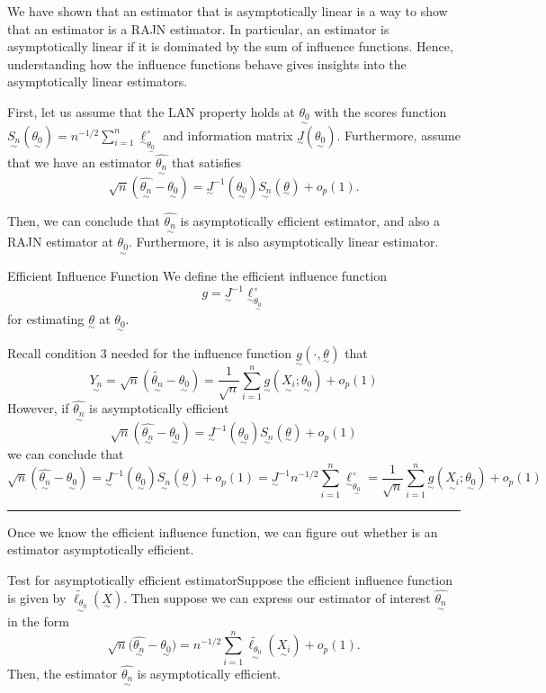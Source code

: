 \documentclass[twoside]{article}
\newenvironment{proof}{{\bf Proof:}}{\hfill\rule{2mm}{2mm}}
\newcommand{\utilde}{\underset{\sim}}
\begin{document}
We have shown that an estimator that is asymptotically linear is a way to show that an estimator is a RAJN estimator. In particular, an estimator is asymptotically linear if it is dominated by the sum of influence functions. Hence, understanding how the influence functions behave gives insights into the asymptotically linear estimators.

First, let us assume that the LAN property holds at $\utilde{\theta_0}$ with the scores function $\utilde{S_n}(\utilde{\theta_0}) = n^{-1/2}\sum_{i=1}^{n}\utilde{\ell}_{\utilde{\theta_0}}^{\circ}$ and information matrix $\utilde{J}(\utilde{\theta_0}).$  Furthermore, assume that we have an estimator $\hat{\utilde{\theta_n}}$ that satisfies 
$$
\sqrt{n}(\hat{\utilde{\theta_n}} - \utilde{\theta_0}) = \utilde{J}^{-1}(\utilde{\theta_0})\utilde{S_n}(\utilde{\theta}) + o_p(1).
$$

Then, we can conclude that $\hat{\utilde{\theta_n}}$ is asymptotically efficient estimator, and also a RAJN estimator at $\utilde{\theta_0}.$ Furthermore, it is also asymptotically linear estimator. 

\begin{definition_exam}{Efficient Influence Function}{}
We define the efficient influence function
$$
g = \utilde{J}^{-1}\utilde{\ell}_{\utilde{\theta_{0}}}^{\circ}
$$
for estimating $\utilde{\theta}$ at $\utilde{\theta_0}.$
\end{definition_exam}
\begin{proof} Recall condition 3 needed for the influence function $\utilde{g}(\cdot, \utilde{\theta})$ that
$$
\utilde{Y_n} = \sqrt{n}(\tilde{\utilde{\theta_n}} - \utilde{\theta_0}) = \frac{1}{\sqrt{n}}\sum_{i=1}^{n}\utilde{g}(\utilde{X_i}; \utilde{\theta_0}) + o_p(1)
$$
However, if $\hat{\utilde{\theta_n}}$ is asymptotically efficient 
$$
\sqrt{n}(\hat{\utilde{\theta_n}} - \utilde{\theta_0}) = \utilde{J}^{-1}(\utilde{\theta_0})\utilde{S_n}(\utilde{\theta}) + o_p(1)
$$
we can conclude that 
$$
\sqrt{n}(\hat{\utilde{\theta_n}} - \utilde{\theta_0}) = \utilde{J}^{-1}(\utilde{\theta_0})\utilde{S_n}(\utilde{\theta}) + o_p(1) = \utilde{J}^{-1} n^{-1/2}\sum_{i=1}^{n}\utilde{\ell}_{\utilde{\theta_{0}}}^{\circ} = \frac{1}{\sqrt{n}}\sum_{i=1}^{n}\utilde{g}(\utilde{X_i}; \utilde{\theta_0}) + o_p(1)
$$
\end{proof}

Once we know the efficient influence function, we can figure out whether is an estimator asymptotically efficient.
\begin{theorem_exam}{Test for asymptotically efficient estimator}{}Suppose the efficient influence function is given by $\tilde{\utilde{\ell_{\theta_{0}}}}(\utilde{X}).$ Then suppose we can express our estimator of interest $\hat{\utilde{\theta_n}}$ in the form 
$$
\sqrt{n}\bigg(\hat{\utilde{\theta_n}} - \utilde{\theta_0} \bigg) = n^{-1/2}\sum_{i=1}^{n}\tilde{\utilde{\ell_{\theta_{0}}}}(\utilde{X_i}) + o_p(1).
$$
Then, the estimator $\hat{\utilde{\theta_n}}$ is asymptotically efficient.
\end{theorem_exam}
\end{document}
